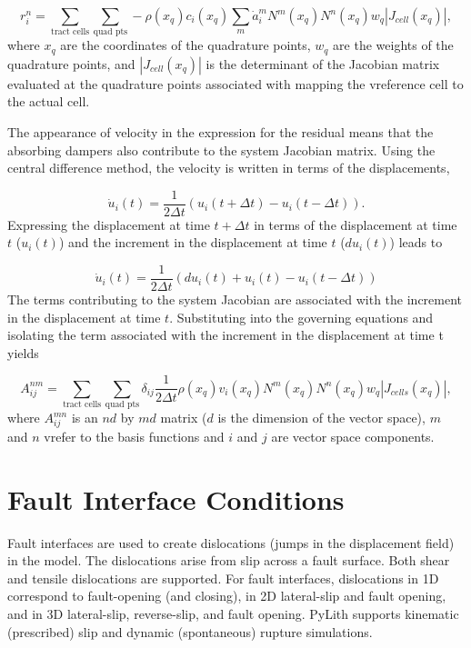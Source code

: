 \begin{equation}
r_{i}^{n}=\sum_{\text{tract cells}}\sum_{\text{quad pts}}-\rho(x_{q})c_{i}(x_{q})\sum_{m}\dot{a}_{i}^{m}N^{m}(x_{q})N^{n}(x_{q})w_{q}|J_{cell}(x_{q})|,
\end{equation}
 where $x_{q}$ are the coordinates of the quadrature points, $w_{q}$
are the weights of the quadrature points, and $|J_{cell}(x_{q})|$
is the determinant of the Jacobian matrix evaluated at the quadrature
points associated with mapping the vreference cell to the actual cell.

The appearance of velocity in the expression for the residual means
that the absorbing dampers also contribute to the system Jacobian
matrix. Using the central difference method, the velocity is written
in terms of the displacements,

\begin{equation}
\dot{u}_{i}(t)=\frac{1}{2\Delta t}(u_{i}(t+\Delta t)-u_{i}(t-\Delta t)).
\end{equation}
Expressing the displacement at time $t+\Delta t$ in terms of the
displacement at time $t$ ($u_{i}(t)$) and the increment in the displacement
at time $t$ ($du_{i}(t)$) leads to

\begin{equation}
\dot{u}_{i}(t)=\frac{1}{2\Delta t}(du_{i}(t)+u_{i}(t)-u_{i}(t-\Delta t))
\end{equation}
The terms contributing to the system Jacobian are associated with
the increment in the displacement at time $t$. Substituting into
the governing equations and isolating the term associated with the
increment in the displacement at time t yields

\begin{equation}
A_{ij}^{nm}=\sum_{\text{tract cells}}\sum_{\text{quad pts}}\delta_{ij}\frac{1}{2\Delta t}\rho(x_{q})v_{i}(x_{q})N^{m}(x_{q})N^{n}(x_{q})w_{q}|J_{cells}(x_{q})|,
\end{equation}
where $A_{ij}^{mn}$ is an $nd$ by $md$ matrix ($d$ is the dimension
of the vector space), $m$ and $n$ vrefer to the basis functions and
$i$ and $j$ are vector space components.


\section{\label{sec:fault}Fault Interface Conditions}

Fault interfaces are used to create dislocations (jumps in the displacement
field) in the model. The dislocations arise from slip across a fault
surface. Both shear and tensile dislocations are supported. For fault
interfaces, dislocations in 1D correspond to fault-opening (and closing),
in 2D lateral-slip and fault opening, and in 3D lateral-slip, reverse-slip,
and fault opening. PyLith supports kinematic (prescribed) slip and
dynamic (spontaneous) rupture simulations.


